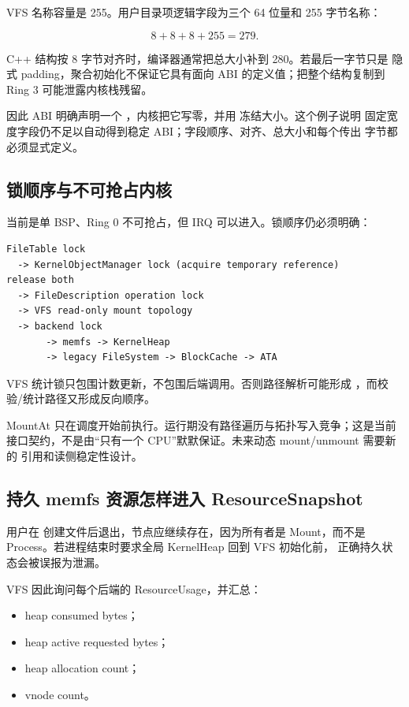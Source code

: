 VFS 名称容量是 255。用户目录项逻辑字段为三个 64 位量和 255 字节名称：

\[
  8+8+8+255=279.
\]

C++ 结构按 8 字节对齐时，编译器通常把总大小补到 280。若最后一字节只是
隐式 padding，聚合初始化不保证它具有面向 ABI 的定义值；把整个结构复制到
Ring 3 可能泄露内核栈残留。

因此 ABI 明确声明一个 ，内核把它写零，并用
 冻结大小。这个例子说明
固定宽度字段仍不足以自动得到稳定 ABI；字段顺序、对齐、总大小和每个传出
字节都必须显式定义。

\subsection{锁顺序与不可抢占内核}

当前是单 BSP、Ring 0 不可抢占，但 IRQ 可以进入。锁顺序仍必须明确：

\begin{lstlisting}[caption={文件路径的主要锁顺序}]
FileTable lock
  -> KernelObjectManager lock (acquire temporary reference)
release both
  -> FileDescription operation lock
  -> VFS read-only mount topology
  -> backend lock
       -> memfs -> KernelHeap
       -> legacy FileSystem -> BlockCache -> ATA
\end{lstlisting}

VFS 统计锁只包围计数更新，不包围后端调用。否则路径解析可能形成
，而校验/统计路径又形成反向顺序。

MountAt 只在调度开始前执行。运行期没有路径遍历与拓扑写入竞争；这是当前
接口契约，不是由“只有一个 CPU”默默保证。未来动态 mount/unmount 需要新的
引用和读侧稳定性设计。

\subsection{持久 memfs 资源怎样进入 ResourceSnapshot}

用户在  创建文件后退出，节点应继续存在，因为所有者是
Mount，而不是 Process。若进程结束时要求全局 KernelHeap 回到 VFS 初始化前，
正确持久状态会被误报为泄漏。

VFS 因此询问每个后端的 ResourceUsage，并汇总：

\begin{itemize}
  \item heap consumed bytes；
  \item heap active requested bytes；
  \item heap allocation count；
  \item vnode count。
\end{itemize}

